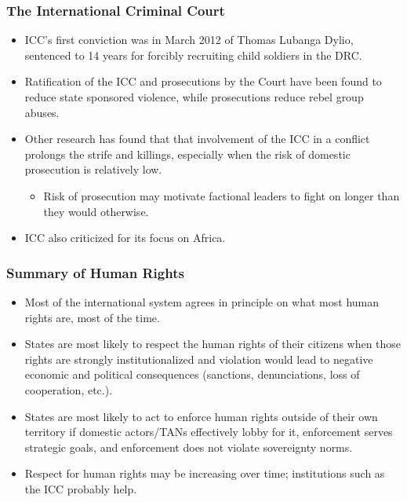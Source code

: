 \documentclass[handout]{beamer}
\begin{document}
\begin{frame} 
	\frametitle{\LARGE{The International Criminal Court}}
	\begin{itemize}
		\item ICC's first conviction was in March 2012 of Thomas Lubanga Dylio, sentenced to 14 years for forcibly recruiting child soldiers in the DRC. \pause
		\item Ratification of the ICC and prosecutions by the Court have been found to reduce state sponsored violence, while prosecutions reduce rebel group abuses. \pause
		\item Other research has found that that involvement of the ICC in a conflict prolongs the strife and killings, especially when the risk of domestic prosecution is relatively low.
		\begin{itemize}
			\item Risk of prosecution may motivate factional leaders to fight on longer than they would otherwise.
		\end{itemize}
		\item ICC also criticized for its focus on Africa.	
	\end{itemize}
\end{frame}

\begin{frame} 
	\frametitle{\LARGE{Summary of Human Rights}}
	\begin{itemize}
		\item Most of the international system agrees in principle on what most human rights are, most of the time. \pause
		\item States are most likely to respect the human rights of their citizens when those rights are strongly institutionalized and violation would lead to negative economic and political consequences (sanctions, denunciations, loss of cooperation, etc.). \pause
		\item States are most likely to act to enforce human rights outside of their own territory if domestic actors/TANs effectively lobby for it, enforcement serves strategic goals, and enforcement does not violate sovereignty norms. \pause
		\item Respect for human rights may be increasing over time; institutions such as the ICC probably help.
	\end{itemize}
\end{frame}
\end{document}
